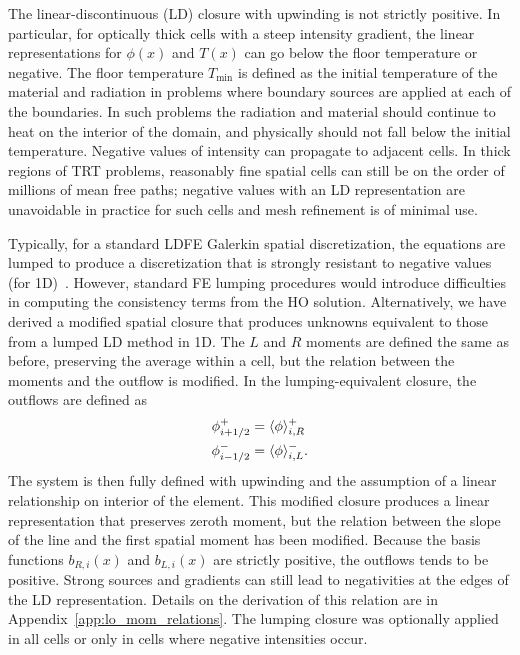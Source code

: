 The linear-discontinuous (LD) closure with upwinding is not strictly positive.  In particular, for
optically thick cells with a steep intensity gradient, the linear representations for
$\phi(x)$ and $T(x)$ can go below the floor temperature or negative. 
The floor temperature $T_{\min}$ is defined as the initial
temperature of the material and radiation in problems where boundary sources are
applied at each of the boundaries.  In such problems the radiation and material should
continue to heat on the interior of the domain, and physically should not fall below
the initial temperature. 
Negative values of intensity can propagate to adjacent cells. In thick regions of
TRT problems, reasonably fine spatial cells can still be on the order of millions of mean
free paths; negative values with an LD representation are unavoidable in practice for
such cells and mesh refinement is of minimal use. 

Typically, for a standard LDFE Galerkin spatial discretization,
the equations are lumped to produce a discretization that is strongly resistant to
negative values (for 1D)~\cite{morel_ldtrt}.
However, standard FE lumping
procedures would introduce difficulties in computing the consistency terms from the
HO solution.  
 Alternatively, we have derived a modified spatial closure that produces
unknowns equivalent to those from a lumped LD method in 1D.
The $L$ and $R$ moments are defined the same as before,
preserving the average within a cell, but the relation between the moments and
the outflow is modified. 
In the lumping-equivalent closure, the outflows are defined as
\begin{align}
    \phi_{i+1/2}^+ &= \langle \phi \rangle_{i,R}^+ \\
    \phi_{i-1/2}^- &= \langle \phi \rangle_{i,L}^-. 
\end{align}
The system is then fully defined with upwinding and the assumption of a linear relationship on
interior of the element.  This modified closure produces a linear
representation that preserves zeroth moment, but the relation between the slope of the line and the 
first spatial moment has been modified.  Because the basis functions $b_{R,i}(x)$ and $b_{L,i}(x)$ are strictly
positive, the outflows tends to be positive. Strong sources and gradients can still lead to
negativities at the edges of the LD representation.  Details on the
derivation of this relation are in Appendix~\ref{app:lo_mom_relations}. 
The lumping closure was optionally applied in all cells or only in cells where negative
 intensities occur.  

